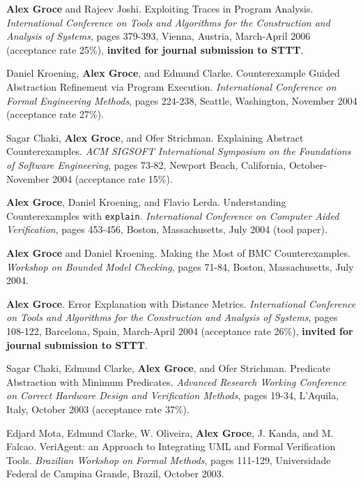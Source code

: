 \documentclass[ComputerScience]{vita}
\begin{document}
\begin{vita}
\begin{Refereed Conference and Workshop Publications}
\item
{\bf Alex Groce} and Rajeev Joshi.
\newblock Exploiting Traces in Program Analysis.
\newblock \emph{International Conference on Tools and Algorithms for the Construction and Analysis of Systems}, pages 379-393, Vienna, Austria, March-April 2006 (acceptance rate 25\%), {\bf invited for journal submission to STTT}.

\item
Daniel Kroening, {\bf Alex Groce}, and Edmund Clarke.
\newblock Counterexample Guided Abstraction Refinement via Program Execution.
\newblock \emph{International Conference on
   Formal Engineering Methods},  pages 224-238, Seattle, Washington, November 2004 (acceptance rate 27\%).

\item
Sagar Chaki, {\bf Alex Groce}, and Ofer Strichman.
\newblock Explaining Abstract Counterexamples.
\newblock \emph{ACM SIGSOFT International Symposium on the Foundations of Software Engineering},  pages 73-82, Newport Beach, California, October-November 2004 (acceptance rate 15\%).

\item
{\bf Alex Groce}, Daniel Kroening, and Flavio Lerda.
\newblock Understanding Counterexamples with {\tt explain}.
\newblock \emph{International Conference on Computer Aided Verification},  pages 453-456, Boston, Massachusetts, July 2004 (tool paper).

\item
{\bf Alex Groce} and Daniel Kroening.
\newblock Making the Most of BMC Counterexamples.
\newblock \emph{Workshop on Bounded Model Checking},  pages 71-84, Boston, Massachusetts, July 2004.


\item
{\bf Alex Groce}.
\newblock Error Explanation with Distance Metrics.
\newblock \emph{International Conference on Tools and Algorithms for the Construction and Analysis of Systems}, pages 108-122, Barcelona, Spain, March-April 2004 (acceptance rate 26\%), {\bf invited for journal submission to STTT}.

\item
Sagar Chaki, Edmund Clarke, {\bf Alex Groce}, and Ofer Strichman.
\newblock Predicate Abstraction with Minimum Predicates.
\newblock \emph{Advanced Research Working Conference on Correct Hardware Design and Verification Methods}, pages 19-34, L'Aquila, Italy, October 2003 (acceptance rate 37\%).

\item
Edjard Mota, Edmund Clarke, W. Oliveira, {\bf Alex Groce}, J. Kanda, and M. Falcao.
\newblock VeriAgent: an Approach to Integrating UML and Formal Verification Tools.
\newblock \emph{Brazilian Workshop on Formal Methods}, pages 111-129, Universidade Federal de Campina Grande, Brazil, October 2003.


\end{Refereed Conference and Workshop Publications}
\end{vita}
\end{document}
